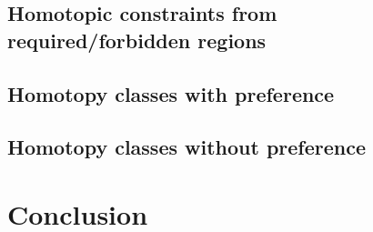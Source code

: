 \documentclass[letterpaper, 10 pt, conference]{ieeeconf}
\begin{document}
\subsection{Homotopic constraints from required/forbidden regions}



\subsection{Homotopy classes with preference}

\subsection{Homotopy classes without preference}




\section{Conclusion}
\label{sec:conclusion}



\end{document}
